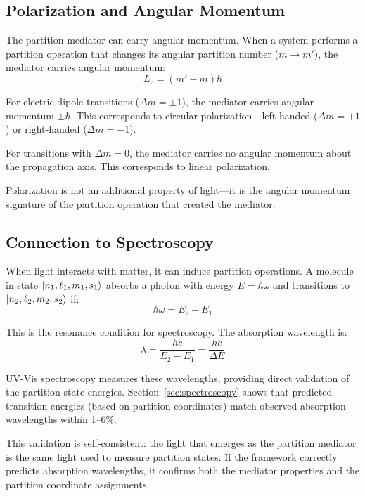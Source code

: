 \documentclass[twocolumn,superscriptaddress,prb,10pt]{revtex4-2}
\begin{document}
\subsection{Polarization and Angular Momentum}

The partition mediator can carry angular momentum. When a system performs a partition operation that changes its angular partition number ($m \to m'$), the mediator carries angular momentum:
\begin{equation}
L_z = (m' - m)\hbar
\label{eq:angular_momentum}
\end{equation}

For electric dipole transitions ($\Delta m = \pm 1$), the mediator carries angular momentum $\pm\hbar$. This corresponds to circular polarization—left-handed ($\Delta m = +1$) or right-handed ($\Delta m = -1$).

For transitions with $\Delta m = 0$, the mediator carries no angular momentum about the propagation axis. This corresponds to linear polarization.

Polarization is not an additional property of light—it is the angular momentum signature of the partition operation that created the mediator.

\subsection{Connection to Spectroscopy}

When light interacts with matter, it can induce partition operations. A molecule in state $\ket{n_1, \ell_1, m_1, s_1}$ absorbs a photon with energy $E = \hbar\omega$ and transitions to $\ket{n_2, \ell_2, m_2, s_2}$ if:
\begin{equation}
\hbar\omega = E_2 - E_1
\label{eq:resonance}
\end{equation}

This is the resonance condition for spectroscopy. The absorption wavelength is:
\begin{equation}
\lambda = \frac{hc}{E_2 - E_1} = \frac{hc}{\Delta E}
\label{eq:wavelength}
\end{equation}

UV-Vis spectroscopy measures these wavelengths, providing direct validation of the partition state energies. Section~\ref{sec:spectroscopy} shows that predicted transition energies (based on partition coordinates) match observed absorption wavelengths within 1--6\%.

This validation is self-consistent: the light that emerges as the partition mediator is the same light used to measure partition states. If the framework correctly predicts absorption wavelengths, it confirms both the mediator properties and the partition coordinate assignments.
\end{document}
